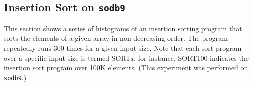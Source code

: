 \documentclass[10pt]{article}
\begin{document}
\clearpage
\pagebreak

\subsection{Insertion Sort on {\tt sodb9}~\label{sec:new_ins_sort}} 
This section shows a series of histograms of an insertion sorting program that 
sorts the elements of a given array in non-decreasing order. 
The program repeatedly runs 300 times for a given input size. 
Note that each sort program over a specific input size is termed SORT{\it x}: 
for instance, SORT100 indicates the insertion sort program over 100K elements. 
(This experiment was performed on {\tt sodb9}.)

\begin{figure}[htp!]
	\centering
\end{figure}
\end{document}
